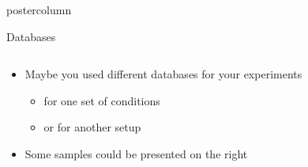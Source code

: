 \documentclass[final,hyperref={pdfpagelabels=false}]{beamer}
\begin{document}
\begin{frame}
\begin{columns}
\begin{column}{.49\textwidth}
\begin{beamercolorbox}[center,wd=\textwidth]{postercolumn}
\begin{minipage}[T]{.95\textwidth}
{            \begin{block}{Databases}
              \begin{columns}
                \begin{column}{.6\textwidth}
                  \begin{itemize}
                  \item Maybe you used different databases for your experiments
                    \begin{itemize}
                    \item for one set of conditions
                    \item or for another setup
                    \end{itemize}
                  \item Some samples could be presented on the right
                  \end{itemize}
                \end{column}
\end{columns}
\end{block}}
\end{minipage}
\end{beamercolorbox}
\end{column}
\end{columns}
\end{frame}
\end{document}
